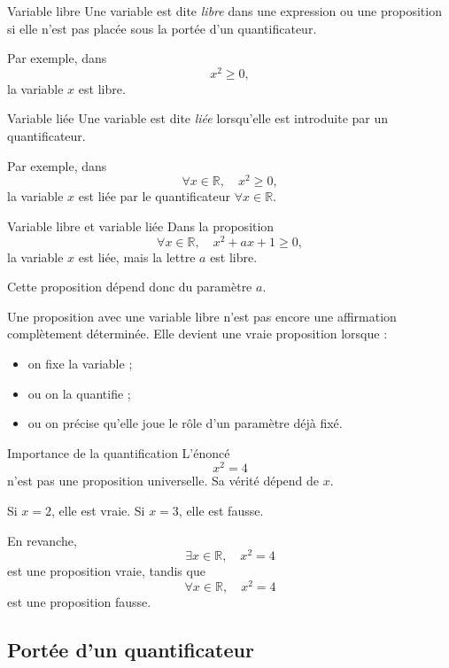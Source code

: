 \documentclass[11pt,a4paper]{article}
\begin{document}
\begin{definitionbox}{Variable libre}{}
Une variable est dite \emph{libre} dans une expression ou une proposition si elle n'est pas placée sous la portée d'un quantificateur.

Par exemple, dans
\[
x^2\geq 0,
\]
la variable $x$ est libre.
\end{definitionbox}

\begin{definitionbox}{Variable liée}{}
Une variable est dite \emph{liée} lorsqu'elle est introduite par un quantificateur.

Par exemple, dans
\[
\forall x\in\mathbb{R},\quad x^2\geq 0,
\]
la variable $x$ est liée par le quantificateur $\forall x\in\mathbb{R}$.
\end{definitionbox}

\begin{exemplebox}{Variable libre et variable liée}{}
Dans la proposition
\[
\forall x\in\mathbb{R},\quad x^2+a x+1\geq 0,
\]
la variable $x$ est liée, mais la lettre $a$ est libre.

Cette proposition dépend donc du paramètre $a$.
\end{exemplebox}

\begin{retenirbox}
Une proposition avec une variable libre n'est pas encore une affirmation complètement déterminée. Elle devient une vraie proposition lorsque :
\begin{itemize}
    \item on fixe la variable ;
    \item ou on la quantifie ;
    \item ou on précise qu'elle joue le rôle d'un paramètre déjà fixé.
\end{itemize}
\end{retenirbox}

\begin{exemplebox}{Importance de la quantification}{}
L'énoncé
\[
x^2=4
\]
n'est pas une proposition universelle. Sa vérité dépend de $x$.

Si $x=2$, elle est vraie.  
Si $x=3$, elle est fausse.

En revanche,
\[
\exists x\in\mathbb{R},\quad x^2=4
\]
est une proposition vraie, tandis que
\[
\forall x\in\mathbb{R},\quad x^2=4
\]
est une proposition fausse.
\end{exemplebox}

\subsection{Portée d'un quantificateur}
\end{document}
